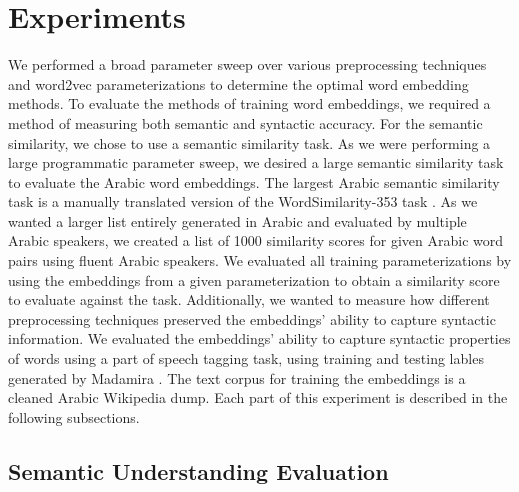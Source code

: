 \section{Experiments}

We performed a broad parameter sweep over various preprocessing techniques and word2vec parameterizations to determine the optimal word embedding methods. To evaluate the methods of training word embeddings, we required a method of measuring both semantic and syntactic accuracy. For the semantic similarity, we chose to use a semantic similarity task. As we were performing a large programmatic parameter sweep, we desired a large semantic similarity task to evaluate the Arabic word embeddings. The largest Arabic semantic similarity task is a manually translated version of the WordSimilarity-353 task \cite{finkelstein:2001,hassan:2009}. As we wanted a larger list entirely generated in Arabic and evaluated by multiple Arabic speakers, we created a list of 1000 similarity scores for given Arabic word pairs using fluent Arabic speakers. We evaluated all training parameterizations by using the embeddings from a given parameterization to obtain a similarity score to evaluate against the task. Additionally, we wanted to measure how different preprocessing techniques preserved the embeddings' ability to capture syntactic information. We evaluated the embeddings' ability to capture syntactic properties of words using a part of speech tagging task, using training and testing lables generated by Madamira \cite{pasha:2014}. The text corpus for training the embeddings is a cleaned Arabic Wikipedia dump. Each part of this experiment is described in the following subsections.

\subsection{Semantic Understanding Evaluation}

